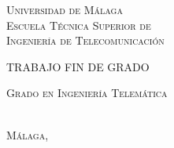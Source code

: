 
\thispagestyle{empty}


	\begin{center}
		\Large \scshape
		Universidad de Málaga\\
		\bigskip
		Escuela Técnica Superior de\\
		Ingeniería de Telecomunicación
	\end{center}

	\bigskip


\bigskip

	\bigskip \bigskip \bigskip \bigskip

	\begin{center}
		\Large \scshape
		TRABAJO FIN DE GRADO
	\end{center}

	\bigskip \bigskip \bigskip \bigskip

\begin{center} 
    \huge \scshape \tfgtitlename 
\end{center}

	\vfill

	\begin{center}
		\Large \scshape
		Grado en Ingeniería Telemática\\
		
	\end{center}

	\bigskip \bigskip \bigskip \bigskip


	\begin{flushright}
		\large \scshape
		\tfgauthorname \\%
		Málaga, \tfganno %
	\end{flushright}



\blankpage
